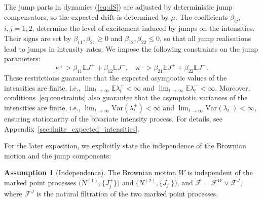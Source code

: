 \documentclass[11pt,a4paper]{article}
\numberwithin{equation}{section}
\theoremstyle{remark}
\theoremstyle{definition}
\newtheorem{assumption}{Assumption}[section]
\newcommand{\E}{{\mathbb{E}}}
\newcommand{\Fc}{\mathcal{F}}
\begin{document}
The jump parts in dynamics (\ref{eq:dS}) are adjusted by deterministic jump compensators, so the expected drift is determined by $\mu$. The coefficients $\beta_{ij}$, $i,j=1,2$, determine the level of excitement induced by jumps on the intensities.
Their signs are set by $\beta_{11}, \beta_{21}\geq0$ and $\beta_{12},
\beta_{22} \leq 0$, so that all jump realisations lead to jumps in intensity rates. We impose the following constraints on the jump parameters:
\begin{equation}
\kappa^+ > \beta_{11}\E J^+ + \beta_{12}\E J^-, \quad
\kappa^- > \beta_{21}\E J^+ + \beta_{22}\E J^-.
\label{eq:constraints}
\end{equation}
These restrictions guarantee that the expected asymptotic values of the intensities are finite,
 i.e., $\lim_{t\rightarrow \infty}\E\lambda^+_t<\infty$ and $\lim_{t\rightarrow \infty}\E\lambda^-_t<\infty$. Moreover, conditions~\eqref{eq:constraints} also guarantee that the asymptotic variances of the intensities are finite,
i.e., $\lim_{t\to\infty}\text{Var}(\lambda^+_t)<\infty$ and $\lim_{t\to\infty}\text{Var}(\lambda^-_t)<\infty$,
ensuring stationarity of the bivariate intensity process.
For details, see Appendix~\ref{sec:finite_expected_intensities}.

  For the later exposition, we explicitly state the independence of
  the Brownian motion and the jump components:
  \begin{assumption}[Independence]
    \label{assumption:independence}
The Brownian motion $W$ is independent of the marked point processes
$\big(N^{(1)},\{J^{+}_j\}\big)$ and $\big(N^{(2)},\{J^{-}_j\}\big)$, and
$\Fc=\Fc^W\vee \Fc^J$, where $\Fc^{J}$ is the natural filtration of the two marked point processes.
\end{assumption}
\end{document}
